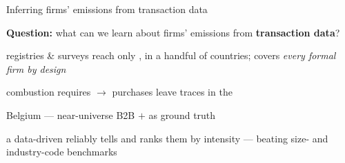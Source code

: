 
\begin{frame}{Inferring firms' emissions from transaction data}

    \begin{tcolorbox}[colback=green!5,colframe=green!40!black]
        \textbf{Question:} what can we learn about firms' emissions from \textbf{transaction data}?
    \end{tcolorbox}

    \begin{wideitemize}
        \item \textbf{} registries \& surveys reach only , in a handful of countries;  covers \emph{every formal firm by design}
        \item \textbf{} combustion requires  $\rightarrow$ purchases leave traces in the 
        \item \textbf{} Belgium --- near-universe B2B $+$  as ground truth
        \item \textbf{} a data-driven  reliably tells  and ranks them by intensity --- beating size- and industry-code benchmarks
    \end{wideitemize}

\end{frame}

